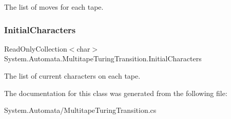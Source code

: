The list of moves for each tape. 

\mbox{\label{class_system_1_1_automata_1_1_multitape_turing_transition_ac75736919c5dd909eda605dbb2e1a963}} 
\subsubsection{\texorpdfstring{Initial\+Characters}{InitialCharacters}}
{\footnotesize\ttfamily Read\+Only\+Collection$<$char$>$ System.\+Automata.\+Multitape\+Turing\+Transition.\+Initial\+Characters\hspace{0.3cm}{\ttfamily [get]}}



The list of current characters on each tape. 



The documentation for this class was generated from the following file\+:\begin{DoxyCompactItemize}
\item 
System.\+Automata/Multitape\+Turing\+Transition.\+cs\end{DoxyCompactItemize}
